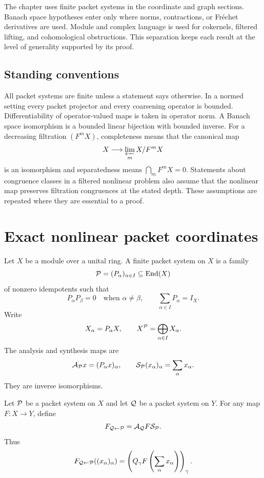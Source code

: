 The chapter uses finite packet systems in the coordinate and graph sections.  Banach space hypotheses enter only where norms, contractions, or Fr\'echet derivatives are used.  Module and complex language is used for cokernels, filtered lifting, and cohomological obstructions.  This separation keeps each result at the level of generality supported by its proof.

\subsection*{Standing conventions}
All packet systems are finite unless a statement says otherwise.  In a normed setting every packet projector and every coarsening operator is bounded.  Differentiability of operator-valued maps is taken in operator norm.  A Banach space isomorphism is a bounded linear bijection with bounded inverse.  For a decreasing filtration $(F^mX)$, completeness means that the canonical map
\[
X\longrightarrow\varprojlim_m X/F^mX
\]
is an isomorphism and separatedness means $\bigcap_mF^mX=0$.  Statements about congruence classes in a filtered nonlinear problem also assume that the nonlinear map preserves filtration congruences at the stated depth.  These assumptions are repeated where they are essential to a proof.

\section{Exact nonlinear packet coordinates}\label{sec:nonlinear_coordinates}

Let $X$ be a module over a unital ring.  A finite packet system on $X$ is a family
\[
\mathcal P=(P_\alpha)_{\alpha\in I}\subseteq\operatorname{End}(X)
\]
of nonzero idempotents such that
\[
P_\alpha P_\beta=0
\quad\text{when }\alpha\ne\beta,
\qquad
\sum_{\alpha\in I}P_\alpha=I_X.
\]
Write
\[
X_\alpha=P_\alpha X,
\qquad
X^{\mathcal P}=\bigoplus_{\alpha\in I}X_\alpha.
\]
The analysis and synthesis maps are
\[
\mathcal A_{\mathcal P}x=(P_\alpha x)_\alpha,
\qquad
\mathcal S_{\mathcal P}(x_\alpha)_\alpha=\sum_\alpha x_\alpha.
\]
They are inverse isomorphisms.

\begin{definition}\label{def:nonlinear_packet_map}
Let $\mathcal P$ be a packet system on $X$ and let $\mathcal Q$ be a packet system on $Y$.  For any map $F:X\to Y$, define
\[
F_{\mathcal Q\leftarrow\mathcal P}
=
\mathcal A_{\mathcal Q}F\mathcal S_{\mathcal P}.
\]
Thus
\[
F_{\mathcal Q\leftarrow\mathcal P}((x_\alpha)_\alpha)
=
\left(
Q_\gamma F\left(\sum_\alpha x_\alpha\right)
\right)_\gamma.
\]
\end{definition}

